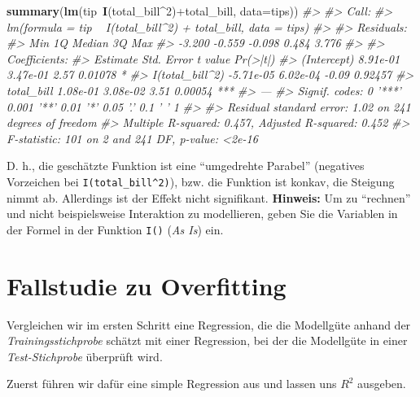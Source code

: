 \documentclass[12pt,ngerman,]{book}
\makeatletter
\newenvironment{Shaded}{\begin{snugshade}}{\end{snugshade}}
\newcommand{\KeywordTok}[1]{\textcolor[rgb]{0.13,0.29,0.53}{\textbf{{#1}}}}
\newcommand{\DataTypeTok}[1]{\textcolor[rgb]{0.13,0.29,0.53}{{#1}}}
\newcommand{\DecValTok}[1]{\textcolor[rgb]{0.00,0.00,0.81}{{#1}}}
\newcommand{\StringTok}[1]{\textcolor[rgb]{0.31,0.60,0.02}{{#1}}}
\newcommand{\CommentTok}[1]{\textcolor[rgb]{0.56,0.35,0.01}{\textit{{#1}}}}
\newcommand{\NormalTok}[1]{{#1}}
\newenvironment{kframe}{%
\medskip{}
\setlength{\fboxsep}{.8em}
 \def\at@end@of@kframe{}%
 \ifinner\ifhmode%
  \def\at@end@of@kframe{\end{minipage}}%
  \begin{minipage}{\columnwidth}%
 \fi\fi%
 \def\FrameCommand##1{\hskip\@totalleftmargin \hskip-\fboxsep
 \colorbox{shadecolor}{##1}\hskip-\fboxsep
     \hskip-\linewidth \hskip-\@totalleftmargin \hskip\columnwidth}%
 \MakeFramed {\advance\hsize-\width
   \@totalleftmargin\z@ \linewidth\hsize
   \@setminipage}}%
 {\par\unskip\endMakeFramed%
 \at@end@of@kframe}
\renewenvironment{Shaded}{\begin{kframe}}{\end{kframe}}
\makeatother
\begin{document}
\begin{Shaded}
\begin{Highlighting}[]
\KeywordTok{summary}\NormalTok{(}\KeywordTok{lm}\NormalTok{(tip~}\KeywordTok{I}\NormalTok{(total_bill^}\DecValTok{2}\NormalTok{)+total_bill, }\DataTypeTok{data=}\NormalTok{tips))}
\CommentTok{#> }
\CommentTok{#> Call:}
\CommentTok{#> lm(formula = tip ~ I(total_bill^2) + total_bill, data = tips)}
\CommentTok{#> }
\CommentTok{#> Residuals:}
\CommentTok{#>    Min     1Q Median     3Q    Max }
\CommentTok{#> -3.200 -0.559 -0.098  0.484  3.776 }
\CommentTok{#> }
\CommentTok{#> Coefficients:}
\CommentTok{#>                  Estimate Std. Error t value Pr(>|t|)    }
\CommentTok{#> (Intercept)      8.91e-01   3.47e-01    2.57  0.01078 *  }
\CommentTok{#> I(total_bill^2) -5.71e-05   6.02e-04   -0.09  0.92457    }
\CommentTok{#> total_bill       1.08e-01   3.08e-02    3.51  0.00054 ***}
\CommentTok{#> ---}
\CommentTok{#> Signif. codes:  0 '***' 0.001 '**' 0.01 '*' 0.05 '.' 0.1 ' ' 1}
\CommentTok{#> }
\CommentTok{#> Residual standard error: 1.02 on 241 degrees of freedom}
\CommentTok{#> Multiple R-squared:  0.457,  Adjusted R-squared:  0.452 }
\CommentTok{#> F-statistic:  101 on 2 and 241 DF,  p-value: <2e-16}
\end{Highlighting}
\end{Shaded}

D. h., die geschätzte Funktion ist eine ``umgedrehte Parabel''
(negatives Vorzeichen bei \texttt{I(total\_bill\^{}2)}), bzw. die
Funktion ist konkav, die Steigung nimmt ab. Allerdings ist der Effekt
nicht signifikant. \textbf{Hinweis:} Um zu ``rechnen'' und nicht
beispielsweise Interaktion zu modellieren, geben Sie die Variablen in
der Formel in der Funktion \texttt{I()} (\emph{As Is}) ein.

\section{Fallstudie zu Overfitting}\label{overfitting-casestudy}

Vergleichen wir im ersten Schritt eine Regression, die die Modellgüte
anhand der \emph{Trainingsstichprobe} schätzt mit einer Regression, bei
der die Modellgüte in einer \emph{Test-Stichprobe} überprüft wird.

Zuerst führen wir dafür eine simple Regression aus und lassen uns
\(R^2\) ausgeben.

\begin{Shaded}
\end{Shaded}
\end{document}
